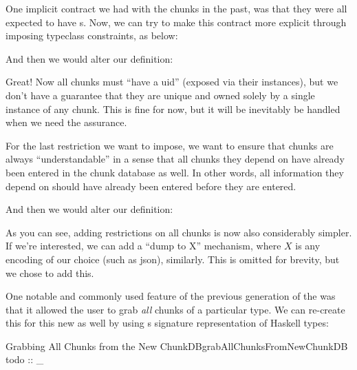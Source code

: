 One implicit contract we had with the chunks in the past, was that they were all
expected to have \UID{}s. Now, we can try to make this contract more explicit
through imposing typeclass constraints, as below:

\uidOwnershipContract{}

And then we would alter our \Chunk{} definition:

\chunksWithUidConstraint{}

Great! Now all chunks must ``have a \acs{uid}'' (exposed via their \HasUID{}
instances), but we don't have a guarantee that they are unique and owned solely
by a single instance of any chunk. This is fine for now, but it will be
inevitably be handled when we need the assurance.

For the last restriction we want to impose, we want to ensure that chunks are
always ``understandable'' in a sense that all chunks they depend on have already
been entered in the chunk database as well. In other words, all information they
depend on should have already been entered before they are entered.

\chunkDependenciesContract{}

And then we would alter our \Chunk{} definition:

\chunksWithUidAndRefListConstraint{}

As you can see, adding restrictions on all chunks is now also considerably
simpler. If we're interested, we can add a ``dump to X'' mechanism, where $X$ is
any encoding of our choice (such as \acs{json}), similarly. This is omitted for
brevity, but we chose to add this.


One notable and commonly used feature of the previous generation of the
\ChunkDB{} was that it allowed the user to grab \textit{all} chunks of a
particular type. We can re-create this for this new \ChunkDB{} as well by using
s \TypeRep{} signature representation of Haskell types:

\begin{pseudohaskell}{Grabbing All Chunks from the New ChunkDB}{grabAllChunksFromNewChunkDB}
todo :: _
\end{pseudohaskell}


